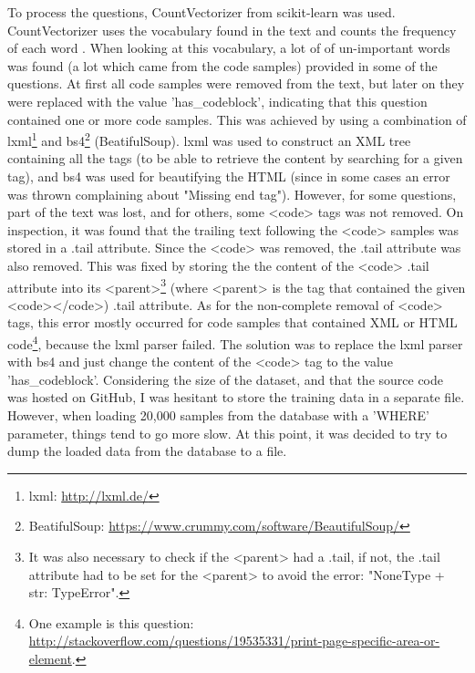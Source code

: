 \noindent
To process the questions, CountVectorizer from scikit-learn was used. 
CountVectorizer uses the vocabulary found in the text and counts the frequency of each word \cite{Scikitlearn.org2016b} \cite[4.2.3]{Scikitlearn.org2016}. 
When looking at this vocabulary, a lot of of un-important words was found (a lot which came from the code samples) provided in some of the questions. 
At first all code samples were removed from the text, but later on they were replaced with the value 'has\_codeblock', indicating that this question contained one or more code samples. 
This was achieved by using a combination of lxml\footnote{lxml: \url{http://lxml.de/}} and bs4\footnote{BeatifulSoup: \url{https://www.crummy.com/software/BeautifulSoup/}} (BeatifulSoup). 
lxml was used to construct an XML tree containing all the tags (to be able to retrieve the content by searching for a given tag), and bs4 was used for beautifying the HTML 
(since in some cases an error was thrown complaining about "Missing end tag").
\vspace{0.5em}\newline
However, for some questions, part of the text was lost, and for others, some <code> tags was not removed. 
On inspection, it was found that the trailing text following the <code> samples was stored in a .tail attribute. 
Since the <code> was removed, the .tail attribute was also removed. 
This was fixed by storing the the content of the <code> .tail attribute into its <parent>\footnote{
	It was also necessary to check if the <parent> had a .tail, if not, the .tail attribute had to be set for the <parent> to avoid the error: 
	"NoneType + str: TypeError".
	} 
(where <parent> is the tag that contained the given <code></code>) .tail attribute. 
As for the non-complete removal of <code> tags, this error mostly occurred for code samples that contained XML or HTML code\footnote{
	One example is this question: \\
	\url{http://stackoverflow.com/questions/19535331/print-page-specific-area-or-element}.
	}, 
because the lxml parser failed. 
The solution was to replace the lxml parser with bs4 and just change the content of the <code> tag to the value 'has\_codeblock'.
\vspace{0.5em}\newline
Considering the size of the dataset, and that the source code was hosted on GitHub, I was hesitant to store the training data in a separate file. 
However, when loading 20,000 samples from the database with a 'WHERE' parameter, things tend to go more slow. 
At this point, it was decided to try to dump the loaded data from the database to a file. 
